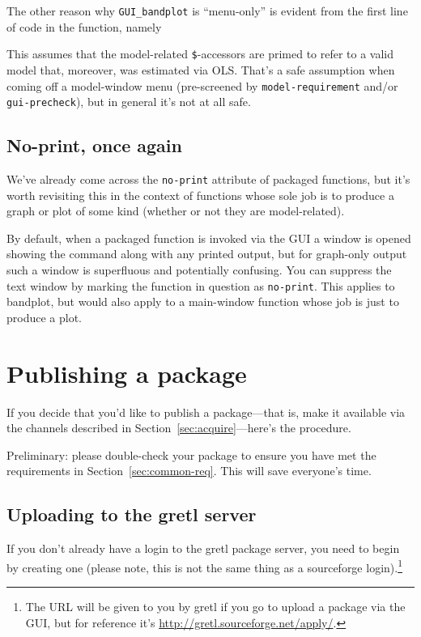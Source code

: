 \documentclass[oneside]{book}
\begin{document}
The other reason why \texttt{GUI\_bandplot} is ``menu-only'' is
evident from the first line of code in the function, namely
%
This assumes that the model-related \texttt{\$}-accessors are primed
to refer to a valid model that, moreover, was estimated via
OLS. That's a safe assumption when coming off a model-window menu
(pre-screened by \texttt{model-requirement} and/or
\texttt{gui-precheck}), but in general it's not at all safe.

\subsection{No-print, once again}

We've already come across the \texttt{no-print} attribute of packaged
functions, but it's worth revisiting this in the context of functions
whose sole job is to produce a graph or plot of some kind (whether or
not they are model-related).

By default, when a packaged function is invoked via the GUI a window
is opened showing the command along with any printed output, but for
graph-only output such a window is superfluous and potentially
confusing.  You can suppress the text window by marking the function
in question as \texttt{no-print}. This applies to bandplot, but
would also apply to a main-window function whose job is just to
produce a plot.

\section{Publishing a package}
\label{sec:publish}

If you decide that you'd like to publish a package---that is, make it
available via the channels described in
Section~\ref{sec:acquire}---here's the procedure.

Preliminary: please double-check your package to ensure you have met
the requirements in Section~\ref{sec:common-req}. This will save
everyone's time.

\subsection{Uploading to the gretl server}

If you don't already have a login to the gretl package server, you
need to begin by creating one (please note, this is not the same thing
as a sourceforge login).\footnote{The URL will be given to you by
  gretl if you go to upload a package via the GUI, but for reference
  it's \url{http://gretl.sourceforge.net/apply/}.}
\end{document}
